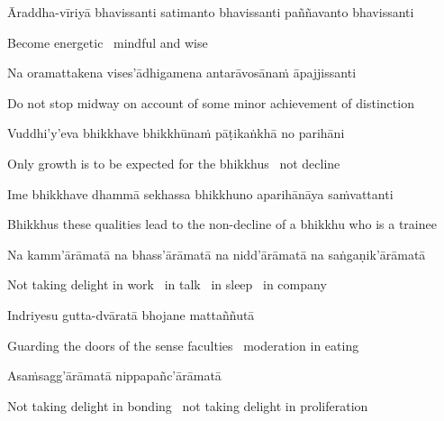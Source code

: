 \begin{pali-hang}
  Āraddha-vīriyā bhavissanti satimanto bhavissanti paññavanto bhavissanti
\end{pali-hang}

\begin{english}
  Become energetic \breathmark\ mindful and wise
\end{english}

Na oramattakena vises'ādhigamena antarāvosānaṁ āpajjissanti

\begin{english-hang}
  Do not stop midway on account of some minor achievement of distinction
\end{english-hang}

Vuddhi'y'eva bhikkhave bhikkhūnaṁ pāṭikaṅkhā no parihāni

\begin{english}
  Only growth is to be expected for the bhikkhus \breathmark\ not decline
\end{english}

\suttaRef{[AN 7.23-27]}

\begin{pali-hang}
  Ime bhikkhave dhammā sekhassa bhikkhuno aparihānāya saṁvattanti
\end{pali-hang}

\begin{english-hang}
  Bhikkhus these qualities lead to the non-decline of a bhikkhu who is a trainee
\end{english-hang}

\begin{pali-hang}
  Na kamm'ārāmatā na bhass'ārāmatā na nidd'ārāmatā na saṅgaṇik'ārāmatā
\end{pali-hang}

\begin{english}
  Not taking delight in work \breathmark\ in talk \breathmark\ in sleep \breathmark\ in company
\end{english}

Indriyesu gutta-dvāratā bhojane mattaññutā

\begin{english}
  Guarding the doors of the sense faculties \breathmark\ moderation in eating
\end{english}

Asaṁsagg'ārāmatā nippapañc'ārāmatā

\begin{english}
  Not taking delight in bonding \breathmark\ not taking delight in proliferation
\end{english}

